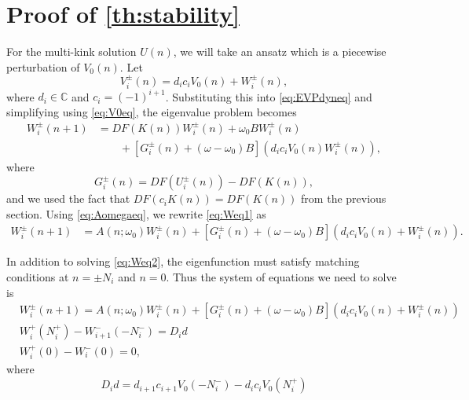 \documentclass[12pt,reqno]{amsart}
\def\C{{\mathbb C}}
\begin{document}
\section{Proof of \cref{th:stability}}

For the multi-kink solution $U(n)$, we will take an ansatz which is a piecewise perturbation of $V_0(n)$. Let
\begin{equation}\label{eq:Viansatz}
V_i^\pm(n) = d_i c_i V_0(n) + W_i^\pm(n),
\end{equation}
where $d_i \in \C$ and $c_i = (-1)^{i+1}$. Substituting this into \cref{eq:EVPdyneq} and simplifying using \cref{eq:V0eq}, the eigenvalue problem becomes
\begin{equation}\label{eq:Weq1}
\begin{aligned}
W_i^\pm(n+1)
&= DF(K(n)) W_i^\pm(n) + \omega_0 B W_i^\pm(n) \\
&\qquad + [G_i^\pm(n) + (\omega - \omega_0) B](d_i c_i V_0(n) W_i^\pm(n)),
\end{aligned}
\end{equation}
where
\begin{equation}\label{eq:Gipm}
G_i^\pm(n) = DF(U_i^\pm(n)) - DF(K(n)),
\end{equation}
and we used the fact that $DF(c_i K(n)) = DF(K(n))$ from the previous section. Using \cref{eq:Aomegaeq}, we rewrite \cref{eq:Weq1} as
\begin{align}\label{eq:Weq2}
W_i^\pm(n+1)
&= A(n; \omega_0) W_i^\pm(n) + [G_i^\pm(n) + (\omega - \omega_0) B](d_i c_i V_0(n) + W_i^\pm(n)).
\end{align}

In addition to solving \cref{eq:Weq2}, the eigenfunction must satisfy matching conditions at $n = \pm N_i$ and $n = 0$. Thus the system of equations we need to solve is
\begin{equation}\label{eq:eigWsystem1}
\begin{aligned}
& W_i^\pm(n+1)
= A(n; \omega_0) W_i^\pm(n) + [G_i^\pm(n) + (\omega - \omega_0) B](d_i c_i V_0(n) + W_i^\pm(n))\\
& W_i^+(N_i^+) - W_{i+1}^-(-N_i^-) = D_i d \\
& W_i^+(0) - W_i^-(0) = 0,
\end{aligned}
\end{equation}
where
\begin{equation}\label{defDid}
D_i d = d_{i+1} c_{i+1} V_0(-N_i^-) - d_i c_i V_0(N_i^+)
\end{equation}
\end{document}
